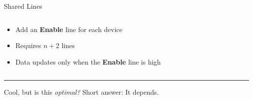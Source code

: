 \documentclass{beamer}
\begin{document}
\begin{frame}{Shared Lines}
    \begin{columns}
        \begin{column}{0.33\textwidth}
            {\footnotesize
            \begin{itemize}
                \item Add an \textbf{Enable} line for each device
                \item Requires $n+2$ lines
                \item Data updates only when the \textbf{Enable} line is high
            \end{itemize}
            }
        \end{column}
        \begin{column}{0.66\textwidth}
            \begin{figure}
            \end{figure}
        \end{column}
    \end{columns}
    \pause
    \vspace{.1in}
    \hrule
    Cool, but is this \emph{optimal?} Short answer: It depends.
\end{frame}
\end{document}
